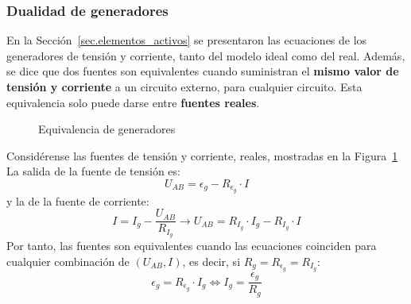 \documentclass[11pt]{book} %
\begin{document}
	\subsubsection{Dualidad de generadores}\label{sec.dualidad}
	
	En la Sección~\ref{sec.elementos_activos} se presentaron las ecuaciones de los generadores de tensión y corriente, tanto del modelo ideal como del real. Además, se dice que dos fuentes son equivalentes cuando suministran el \textbf{mismo valor de tensión y corriente} a un circuito externo, para cualquier circuito. Esta equivalencia solo puede darse entre \textbf{fuentes reales}.
	
	\begin{figure}[htbp]
		\centering
		\hfil
		\caption{Equivalencia de generadores}
		\label{fig.equivalencia_generadores}
	\end{figure}
	
	Considérense las fuentes de tensión y corriente, reales, mostradas en la Figura~\ref{fig.equivalencia_generadores}
	La salida de la fuente de tensión es:
	\begin{equation*}
		U_{AB} = \epsilon_g - R_{\epsilon_g} \cdot I
	\end{equation*}
	y la de la fuente de corriente:
	\begin{equation*}
		I = I_g - \frac{U_{AB}}{R_{I_g}} \rightarrow U_{AB} = R_{I_g} \cdot I_g - R_{I_g} \cdot I
	\end{equation*} 
	Por tanto, las fuentes son equivalentes cuando las ecuaciones coinciden para cualquier combinación de $(U_{AB}, I)$, es decir, si $R_g = R_{\epsilon_g} = R_{I_g}$:
	\begin{equation}\label{eq.equivalencia_fuentes}
		\boxed{\epsilon_g = R_{\epsilon_g} \cdot I_g \Leftrightarrow {I_g = \frac{\epsilon_g}{R_g}}}  
	\end{equation}
	
\end{document}
